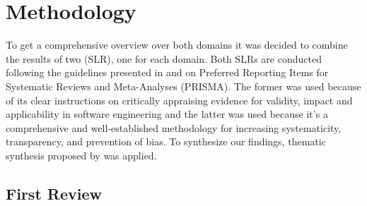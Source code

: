 \documentclass[a4paper,11pt,article,oneside]{memoir}
\begin{document}
\chapter{Methodology}

To get a comprehensive overview over both domains it was decided to combine the results of two (SLR), one for each domain. Both SLRs are conducted following the guidelines presented in \citet{Kitchenham.2004} and \citet{page2021prisma} on Preferred Reporting Items for Systematic Reviews and Meta-Analyses (PRISMA). The former was used because of its clear instructions on critically appraising evidence for validity, impact and applicability in software engineering and the latter was used because it's a comprehensive and well-established methodology for increasing systematicity, transparency, and prevention of bias. To synthesize our findings, thematic synthesis proposed by \citet{Cruzes.2011} was applied. 









\section{First Review}
\end{document}
